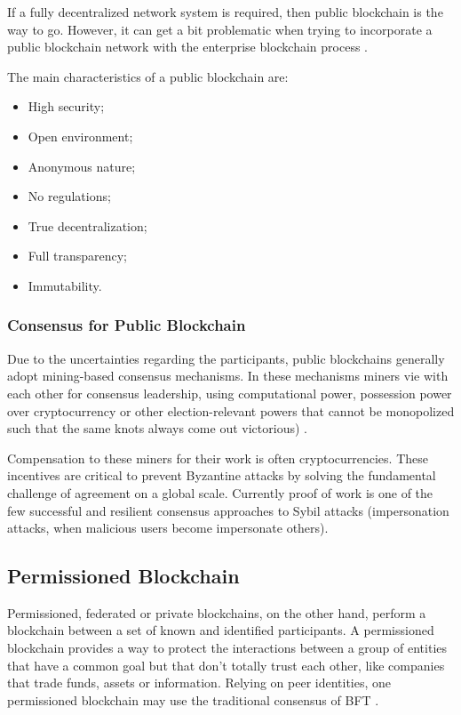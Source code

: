 If a fully decentralized network system is required, then public blockchain is the way to go. However, it can get a bit problematic when trying to incorporate a public blockchain network with the enterprise blockchain process \cite{101blockchains}.

The main characteristics of a public blockchain are:

\begin{itemize}
\item High security;
\item Open environment;
\item Anonymous nature;
\item No regulations;
\item True decentralization;
\item Full transparency;
\item Immutability.
\end{itemize}

\subsubsection{Consensus for Public Blockchain}\label{sec:consensoPublica}
Due to the uncertainties regarding the participants, public blockchains generally adopt mining-based consensus mechanisms. In these mechanisms miners vie with each other for consensus leadership, using computational power, possession power over cryptocurrency or other election-relevant powers that cannot be monopolized such that the same knots always come out victorious) \cite{greve2018blockchain}.

Compensation to these miners for their work is often cryptocurrencies. These incentives are critical to prevent Byzantine attacks by solving the fundamental challenge of agreement on a global scale. Currently proof of work is one of the few successful and resilient consensus approaches to Sybil attacks \cite{douceur2002sybil} (impersonation attacks, when malicious users become impersonate others).

\subsection{Permissioned Blockchain}\label{sec:blockchainPrivada}
Permissioned, federated or private blockchains, on the other hand, perform a blockchain between a set of known and identified participants. A permissioned blockchain provides a way to protect the interactions between a group of entities that have a common goal but that don't totally trust each other, like companies that trade funds, assets or information. Relying on peer identities, one permissioned blockchain may use the traditional consensus of \acf{BFT} \cite{androulaki2018hyperledger}.

